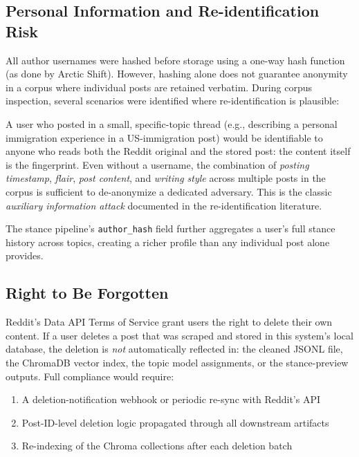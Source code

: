 \documentclass[11pt,a4paper]{article}
\begin{document}
\subsection{Personal Information and Re-identification Risk}

All author usernames were hashed before storage using a one-way hash function (as done by Arctic Shift). However, hashing alone does not guarantee anonymity in a corpus where individual posts are retained verbatim. During corpus inspection, several scenarios were identified where re-identification is plausible:

A user who posted in a small, specific-topic thread (e.g., describing a personal immigration experience in a US-immigration post) would be identifiable to anyone who reads both the Reddit original and the stored post: the content itself is the fingerprint. Even without a username, the combination of \textit{posting timestamp}, \textit{flair}, \textit{post content}, and \textit{writing style} across multiple posts in the corpus is sufficient to de-anonymize a dedicated adversary. This is the classic \textit{auxiliary information attack} documented in the re-identification literature.

The stance pipeline's \texttt{author\_hash} field further aggregates a user's full stance history across topics, creating a richer profile than any individual post alone provides.

\subsection{Right to Be Forgotten}

Reddit's Data API Terms of Service grant users the right to delete their own content. If a user deletes a post that was scraped and stored in this system's local database, the deletion is \textit{not} automatically reflected in: the cleaned JSONL file, the ChromaDB vector index, the topic model assignments, or the stance-preview outputs. Full compliance would require:

\begin{enumerate}
  \item A deletion-notification webhook or periodic re-sync with Reddit's API
  \item Post-ID-level deletion logic propagated through all downstream artifacts
  \item Re-indexing of the Chroma collections after each deletion batch
\end{enumerate}
\end{document}
